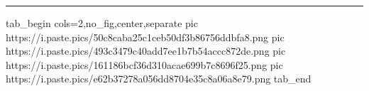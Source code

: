  
 
 
 
 

\par\noindent\rule{\textwidth}{0.4pt}

\ifcmt
  tab_begin cols=2,no_fig,center,separate
     pic https://i.paste.pics/50c8caba25c1ceb50df3b86756ddbfa8.png
		 pic https://i.paste.pics/493c3479c40add7ee1b7b54accc872de.png
		 pic https://i.paste.pics/161186bcf36d310acae699b7c8696f25.png
		 pic https://i.paste.pics/e62b37278a056dd8704e35c8a06a8e79.png
  tab_end
\fi

